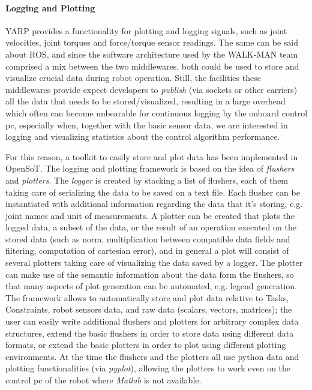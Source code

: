 \paragraph{Logging and Plotting}
\label{par:logging-plotting}
YARP provides a functionality for plotting and logging signals, such as joint velocities, joint torques and force/torque sensor readings.
The same can be said about ROS, and since the software architecture used by the WALK-MAN team comprised a mix between the two middlewares, both could be used to store and visualize crucial data during robot operation. Still, the facilities these middlewares provide expect developers to \emph{publish} (via sockets or other carriers) all the data that needs to be stored/visualized, resulting in a large overhead which often can become unbearable for continuous logging by the onboard control pc, especially when, together with the basic sensor data, we are interested in logging and visualizing statistics about the control algorithm performance.

For this reason, a toolkit to easily store and plot data has been implemented in OpenSoT.
The logging and plotting framework is based on the idea of \emph{flushers} and \emph{plotters}. 
The \emph{logger} is created by stacking a list of flushers, each of them taking care of serializing the data to be saved on a text file. Each flusher can be instantiated with additional information regarding the data that it's storing, e.g. joint names and unit of measurements.
A plotter can be created that plots the logged data, a subset of the data, or the result of an operation executed on the stored data (such as norm, multiplication between compatible data fields and filtering, computation of cartesian error), and in general a plot will consist of several plotters taking care of visualizing the data saved by a logger. The plotter can make use of the semantic information about the data form the flushers, so that many aspects of plot generation can be automated, e.g. legend generation.
The framework allows to automatically store and plot data relative to Tasks, Constraints, robot sensors data, and raw data (scalars, vectors, matrices); the user can easily write additional flushers and plotters for arbitrary complex data structures, extend the basic flushers in order to store data using different data formats, or extend the basic plotters in order to plot using different plotting environments.
At the time the flushers and the plotters all use python data and plotting functionalities (via \emph{pyplot}), allowing the plotters to work even on the control pc of the robot where \emph{Matlab} is not available.

